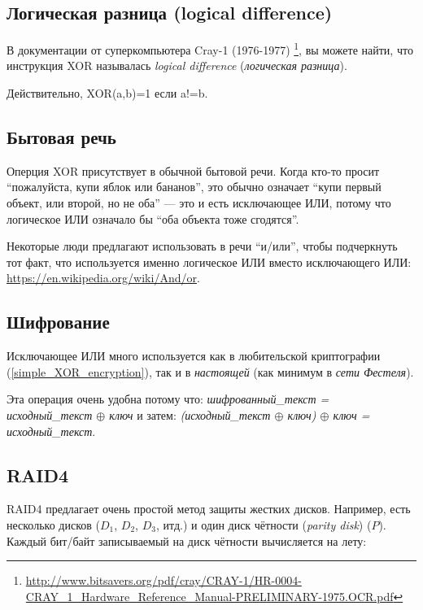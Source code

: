 ﻿
\label{XOR_property}



\subsection{Логическая разница (logical difference)}

В документации от суперкомпьютера Cray-1 (1976-1977)
\footnote{\url{http://www.bitsavers.org/pdf/cray/CRAY-1/HR-0004-CRAY_1_Hardware_Reference_Manual-PRELIMINARY-1975.OCR.pdf}},
вы можете найти, что инструкция XOR называлась \emph{logical difference} (\emph{логическая разница}).

Действительно, XOR(a,b)=1 если a!=b.

\subsection{Бытовая речь}

Оперция XOR присутствует в обычной бытовой речи.
Когда кто-то просит ``пожалуйста, купи яблок или бананов'',
это обычно означает ``купи первый объект, или второй, но не оба'' --- это и есть исключающее ИЛИ,
потому что логическое ИЛИ означало бы ``оба объекта тоже сгодятся''.

Некоторые люди предлагают использовать в речи ``и/или'', чтобы подчеркнуть тот факт, что используется именно логическое ИЛИ
вместо исключающего ИЛИ: \url{https://en.wikipedia.org/wiki/And/or}.

\subsection{Шифрование}

Исключающее ИЛИ много используется как в любительской криптографии (\ref{simple_XOR_encryption}), так и в \emph{настоящей}
(как минимум в \emph{сети Фестеля}).

Эта операция очень удобна потому что:
\emph{шифрованный\_текст = исходный\_текст $\oplus$ ключ} и затем:
\emph{(исходный\_текст $\oplus$ ключ) $\oplus$ ключ = исходный\_текст}.

\subsection{\ac{RAID}4}

\ac{RAID}4 предлагает очень простой метод защиты жестких дисков.
Например, есть несколько дисков ($D_1$, $D_2$, $D_3$, итд.) и один диск чётности (\emph{parity disk}) ($P$).
Каждый бит/байт записываемый на диск чётности вычисляется на лету:

